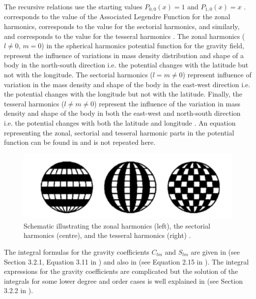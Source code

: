 The recursive relations use the starting values $P_{0,0}(x) = 1$ and $P_{1,0}(x) = x$ \cite{wakker}.  corresponds to the value of the Associated Legendre Function for the zonal harmonics,  corresponds to the value for the sectorial harmonics, and similarly,  and  corresponds to the value for the tesseral harmonics \cite{wakker}. The zonal harmonics ($l \neq 0$, $m=0$) in the spherical harmonics potential function for the gravity field, represent the influence of variations in mass density distribution and shape of a body in the north-south direction i.e. the potential changes with the latitude but not with the longitude. The sectorial harmonics ($l = m \neq 0$) represent influence of variation in the mass density and shape of the body in the east-west direction i.e. the potential changes with the longitude but not with the latitude. Finally, the tesseral harmonics ($l \neq m \neq 0$) represent the influence of the variation in mass density and shape of the body in both the east-west and north-south direction i.e. the potential changes with both the latitude and longitude \cite{wakker}. An equation representing the zonal, sectorial and tesseral harmonic parts in the potential function can be found in \cite{wakker} and is not repeated here.
%
\begin{figure}[htb]
\centering
\captionsetup{justification=centering}
\includegraphics[scale=0.5]{different_spherical_harmonics.png}
\caption{Schematic illustrating the zonal harmonics (left), the sectorial harmonics (centre), and the tesseral harmonics (right) \cite{wakker}.}
\label{fig:different_spherical_harmonics}
\end{figure}

The integral formulas for the gravity coefficients $C_{lm}$ and $S_{lm}$ are given in \cite{gillbook} (see Section 3.2.1, Equation 3.11 in \cite{gillbook}) and also in \cite{danbook} (see Equation 2.15 in \cite{danbook}). The integral expressions for the gravity coefficients are complicated but the solution of the integrals for some lower degree and order cases is well explained in \cite{gillbook} (see Section 3.2.2 in \cite{gillbook}).

